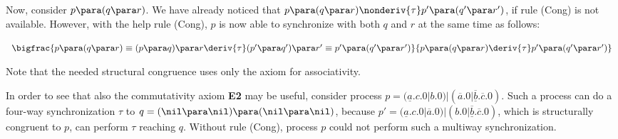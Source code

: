 \begin{example}
Now, consider
$p \para (q \para r)$. We have already
noticed that  $p \para (q \para r) \nonderiv{\tau} p' \para (q' \para r')$, if rule (Cong) is not available.
However, with the help rule (Cong), $p$ is now able to synchronize with both $q$ and $r$ at the same time as follows:

\begin{center}
$\begin{array}{lcllcl}
\bigfrac{p \para (q \para r)  \equiv (p \para q)  \para r   \deriv{\tau}  (p' \para q') \para r' \equiv p' \para (q' \para r')}
{p \para (q \para r) \deriv{\tau}  p' \para (q' \para r')} \\
\end{array}$
\end{center}

\noindent
Note that the needed structural congruence uses only the axiom for associativity.
\fine
\end{example}

% 


\begin{example}\label{comm-needed}
In order to see that also the commutativity axiom {\bf E2} may be useful, consider process $p = 
 (\underline{a}.c.0 | b.0) | (\overline{a}.0 | \underline{\overline{b}}.\overline{c}.0)$. Such a process
 can do a four-way synchronization $\tau$ to $q = (\nil \para \nil) \para (\nil \para \nil)$, because $p' = 
 (\underline{a}.c.0 | \overline{a}.0) | (b.0 | \underline{\overline{b}}.\overline{c}.0)$, which is structurally 
 congruent to $p$, can perform $\tau$ reaching $q$.
Without rule (Cong), process $p$ could not perform such a multiway synchronization.
\fine
\end{example}

